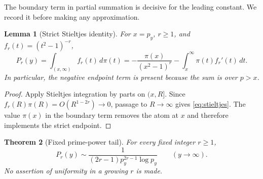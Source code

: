 \documentclass[11pt]{article}
\newtheorem{theorem}{Theorem}[section]
\newtheorem{lemma}[theorem]{Lemma}
\theoremstyle{definition}
\theoremstyle{remark}
\begin{document}
The boundary term in partial summation is decisive for the leading
constant.  We record it before making any approximation.

\begin{lemma}[Strict Stieltjes identity]
\label{lem:stieltjes}
For $x=p_y$, $r\ge1$, and $f_r(t)=(t^2-1)^{-r}$,
\begin{equation}
 P_r(y)=\int_{(x,\infty)}f_r(t)\,d\pi(t)
 =-\frac{\pi(x)}{(x^2-1)^r}
   -\int_x^\infty \pi(t)f_r'(t)\,dt.
 \label{eq:stieltjes}
\end{equation}
In particular, the negative endpoint term is present because the sum is
over $p>x$.
\end{lemma}

\begin{proof}
Apply Stieltjes integration by parts on $(x,R]$.  Since
$f_r(R)\pi(R)=O(R^{1-2r})\to0$, passage to $R\to\infty$ gives
\eqref{eq:stieltjes}.  The value $\pi(x)$ in the boundary term removes the
atom at $x$ and therefore implements the strict endpoint.
\end{proof}

\begin{theorem}[Fixed prime-power tail]
\label{thm:fixed-r}
For every fixed integer $r\ge1$,
\begin{equation}
 \boxed{
 P_r(y)\sim
 \frac{1}{(2r-1)p_y^{2r-1}\log p_y}}
 \qquad(y\to\infty).
 \label{eq:fixed-r}
\end{equation}
No assertion of uniformity in a growing $r$ is made.
\end{theorem}
\end{document}
